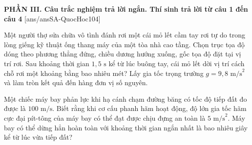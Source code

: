 
\noindent \textbf{PHẦN III. Câu trắc nghiệm trả lời ngắn. Thí sinh trả lời từ câu 1 đến câu 4}
[ans/ansSA-QuocHoc104]

\begin{ex}%
	Một người thợ sửa chữa vô tình đánh rơi một cái mỏ lết cầm tay rơi tự do trong lòng giếng kỹ thuật ống thang máy của một tòa nhà cao tầng. Chọn trục tọa độ dóng theo phương thẳng đứng, chiều dương hướng xuống, gốc tọa độ đặt tại vị trí rơi. Sau khoảng thời gian $1,5\text{ s}$ kể từ lúc buông tay, cái mỏ lết dời vị trí cách chỗ rơi một khoảng bằng bao nhiêu mét? Lấy gia tốc trọng trường $g=9,8\text{ m/s}^2$ và làm tròn kết quả đến hàng đơn vị số nguyên.
\end{ex}

\begin{ex}%
	Một chiếc máy bay phản lực khi hạ cánh chạm đường băng có tốc độ tiếp đất đo được là $100\text{ m/s}$. Biết rằng khi cơ cấu phanh hãm hoạt động, độ lớn gia tốc hãm cực đại pít-tông của máy bay có thể đạt được chịu đựng an toàn là $5\text{ m/s}^2$. Máy bay có thể dừng hẳn hoàn toàn với khoảng thời gian ngắn nhất là bao nhiêu giây kể từ lúc vừa tiếp đất?
\end{ex}

